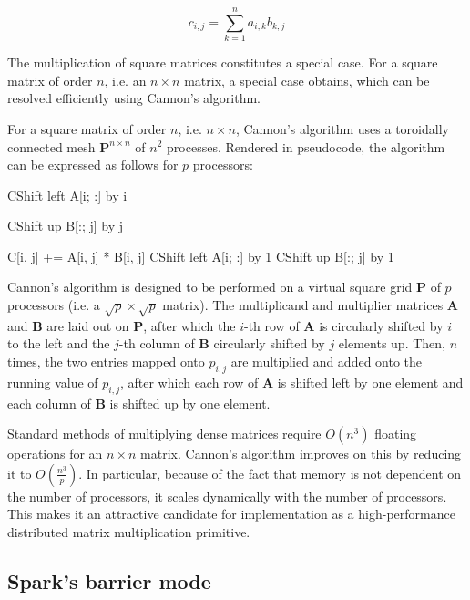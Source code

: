 \documentclass[fleqn,10pt]{SelfArx} %
\begin{document}
$$ c_{i, j} = \sum_{k = 1}^n a_{i, k} b_{k, j} $$

The multiplication of square matrices constitutes a special case. For a square matrix of order $n$, i.e. an $n \times n$ matrix, a special case obtains, which can be resolved efficiently using Cannon's algorithm.\cite{cannon1969cellular} 

For a square matrix of order $n$, i.e. $n \times n$, Cannon's algorithm uses a toroidally connected mesh $\mathbf{P}^{n \times n}$ of $n^2$ processes. Rendered in pseudocode, the algorithm can be expressed as follows for $p$ processors:

\begin{algorithmic}
		\State CShift left A[i; :] by i 
	\EndFor
	
		\State CShift up B[:; j] by j 
	\EndFor
	
			\State C[i, j] += A[i, j] * B[i, j]
			\State CShift left A[i; :] by 1
			\State CShift up B[:; j] by 1
		\EndFor
	\EndFor
\end{algorithmic}

Cannon's algorithm is designed to be performed on a virtual square grid $\mathbf{P}$ of $p$ processors (i.e. a $\sqrt{p} \times \sqrt{p}$ matrix). The multiplicand and multiplier matrices $\mathbf{A}$ and $\mathbf{B}$ are laid out on $\mathbf{P}$, after which the $i$-th row of $\mathbf{A}$ is circularly shifted by $i$ to the left and the $j$-th column of $\mathbf{B}$ circularly shifted by $j$ elements up. Then, $n$ times, the two entries mapped onto $p_{i, j}$ are multiplied and added onto the running value of $p_{i, j}$, after which each row of $\mathbf{A}$ is shifted left by one element and each column of $\mathbf{B}$ is shifted up by one element.

Standard methods of multiplying dense matrices require $O(n^3)$ floating operations for an $n \times n$ matrix. Cannon's algorithm improves on this by reducing it to $O(\frac{n^3}{p})$. In particular, because of the fact that memory is not dependent on the number of processors, it scales dynamically with the number of processors. This makes it an attractive candidate for implementation as a high-performance distributed matrix multiplication primitive.


\subsection{Spark's barrier mode} %
\label{sub:spark_s_barrier_mode}
\end{document}
